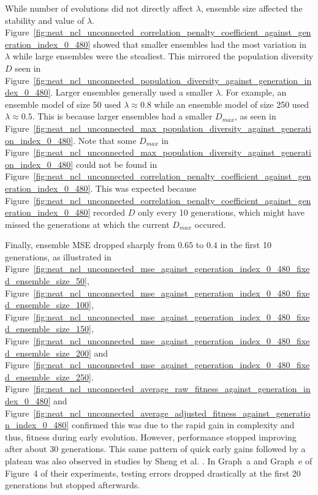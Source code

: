 \documentclass{article}
\begin{document}
While number of evolutions did not directly affect $\lambda$, ensemble size affected the stability and value of $\lambda$. Figure~\ref{fig:neat_ncl_unconnected_correlation_penalty_coefficient_against_generation_index_0_480} showed that smaller ensembles had the most variation in $\lambda$ while large ensembles were the steadiest. This mirrored the population diversity $D$ seen in Figure~\ref{fig:neat_ncl_unconnected_population_diversity_against_generation_index_0_480}. Larger ensembles generally used a smaller $\lambda$. For example, an ensemble model of size 50 used $\lambda \approx 0.8$ while an ensemble model of size 250 used $\lambda \approx 0.5$. This is because larger ensembles had a smaller $D_{max}$, as seen in Figure~\ref{fig:neat_ncl_unconnected_max_population_diversity_against_generation_index_0_480}. Note that some $D_{max}$ in Figure~\ref{fig:neat_ncl_unconnected_max_population_diversity_against_generation_index_0_480} could not be found in Figure~\ref{fig:neat_ncl_unconnected_correlation_penalty_coefficient_against_generation_index_0_480}. This was expected because Figure~\ref{fig:neat_ncl_unconnected_correlation_penalty_coefficient_against_generation_index_0_480} recorded $D$ only every 10 generations, which might have missed the generations at which the current $D_{max}$ occured. 

Finally, ensemble MSE dropped sharply from $0.65$ to $0.4$ in the first 10 generations, as illustrated in Figure~\ref{fig:neat_ncl_unconnected_mse_against_generation_index_0_480_fixed_ensemble_size_50}, Figure~\ref{fig:neat_ncl_unconnected_mse_against_generation_index_0_480_fixed_ensemble_size_100}, Figure~\ref{fig:neat_ncl_unconnected_mse_against_generation_index_0_480_fixed_ensemble_size_150}, Figure~\ref{fig:neat_ncl_unconnected_mse_against_generation_index_0_480_fixed_ensemble_size_200} and Figure~\ref{fig:neat_ncl_unconnected_mse_against_generation_index_0_480_fixed_ensemble_size_250}. Figure~\ref{fig:neat_ncl_unconnected_average_raw_fitness_against_generation_index_0_480} and Figure~\ref{fig:neat_ncl_unconnected_average_adjusted_fitness_against_generation_index_0_480} confirmed this was due to the rapid gain in complexity and thus, fitness during early evolution. However, performance stopped improving after about 30 generations. This same pattern of quick early gains followed by a plateau was also observed in studies by Sheng et al. \cite{sheng2017niching}. In Graph~a and Graph~e of Figure~4 of their experiments, testing errors dropped drastically at the first 20 generations but stopped afterwards. 
\end{document}
